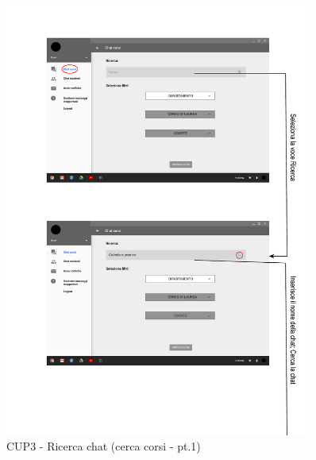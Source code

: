 \begin{figure}
	\centering
	\includegraphics[width=0.9\textwidth]{imgs/gruppo6/activities/act_cup3_ricerca_chat_corsi1.pdf}
	\caption{CUP3 - Ricerca chat (cerca corsi - pt.1)}
	\label{fig:act-cup3-5}
\end{figure}

